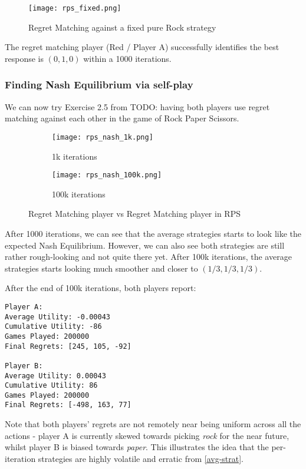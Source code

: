 \documentclass [11pt]{article}
\begin{document}
\begin{figure}[H]
  \centering
  \texttt{[image: rps\_fixed.png]}
  \caption{Regret Matching against a fixed pure Rock strategy}
\end{figure}

The regret matching player (Red / Player A) successfully identifies the best response is $(0, 1, 0)$ within a 1000 iterations.


\subsubsection{Finding Nash Equilibrium via self-play} \label{nash-rps}

We can now try Exercise 2.5 from TODO: having both players use regret matching against each other in the game of Rock Paper Scissors.

\begin{figure}[H]
  \centering
  \begin{subfigure}[b]{0.45\textwidth}
    \centering
    \texttt{[image: rps\_nash\_1k.png]}
    \caption{1k iterations}
  \end{subfigure}
  \begin{subfigure}[b]{0.45\textwidth}
    \centering
    \texttt{[image: rps\_nash\_100k.png]}
    \caption{100k iterations}
  \end{subfigure}

  \caption{Regret Matching player vs Regret Matching player in RPS}
\end{figure}

After 1000 iterations, we can see that the average strategies starts to look like the expected Nash Equilibrium. However, we can also see both strategies are still rather rough-looking and not quite there yet. After 100k iterations, the average strategies starts looking much smoother and closer to $(1/3, 1/3, 1/3)$.

After the end of 100k iterations, both players report:

\begin{verbatim}
Player A:
Average Utility: -0.00043
Cumulative Utility: -86
Games Played: 200000
Final Regrets: [245, 105, -92]

Player B:
Average Utility: 0.00043
Cumulative Utility: 86
Games Played: 200000
Final Regrets: [-498, 163, 77]
\end{verbatim}

Note that both players' regrets are not remotely near being uniform across all the actions - player A is currently skewed towards picking \textit{rock} for the near future, whilst player B is biased towards \textit{paper}. This illustrates the idea that the per-iteration strategies are highly volatile and erratic from \ref{avg-strat}.
\end{document}
